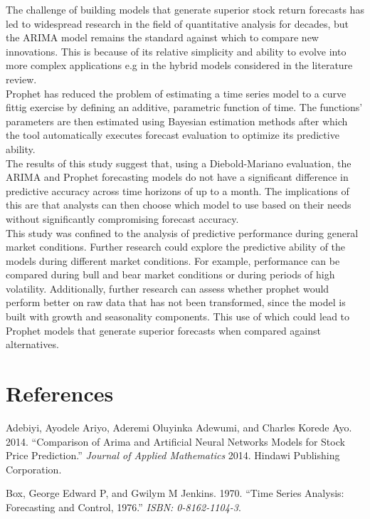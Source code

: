 \documentclass[12pt,a4paper]{article}
\numberwithin{equation}{section}
\numberwithin{figure}{section}
\numberwithin{table}{section}
\begin{document}
The challenge of building models that generate superior stock return
forecasts has led to widespread research in the field of quantitative
analysis for decades, but the ARIMA model remains the standard against
which to compare new innovations. This is because of its relative
simplicity and ability to evolve into more complex applications e.g in
the hybrid models considered in the literature review.\\
Prophet has reduced the problem of estimating a time series model to a
curve fittig exercise by defining an additive, parametric function of
time. The functions' parameters are then estimated using Bayesian
estimation methods after which the tool automatically executes forecast
evaluation to optimize its predictive ability.\\
The results of this study suggest that, using a Diebold-Mariano
evaluation, the ARIMA and Prophet forecasting models do not have a
significant difference in predictive accuracy across time horizons of up
to a month. The implications of this are that analysts can then choose
which model to use based on their needs without significantly
compromising forecast accuracy.\\
This study was confined to the analysis of predictive performance during
general market conditions. Further research could explore the predictive
ability of the models during different market conditions. For example,
performance can be compared during bull and bear market conditions or
during periods of high volatility. Additionally, further research can
assess whether prophet would perform better on raw data that has not
been transformed, since the model is built with growth and seasonality
components. This use of which could lead to Prophet models that generate
superior forecasts when compared against alternatives.

\section*{References}\label{references}

\hypertarget{refs}{}
\hypertarget{ref-adebiyi2014comparison}{}
Adebiyi, Ayodele Ariyo, Aderemi Oluyinka Adewumi, and Charles Korede
Ayo. 2014. ``Comparison of Arima and Artificial Neural Networks Models
for Stock Price Prediction.'' \emph{Journal of Applied Mathematics}
2014. Hindawi Publishing Corporation.

\hypertarget{ref-box1970time}{}
Box, George Edward P, and Gwilym M Jenkins. 1970. ``Time Series
Analysis: Forecasting and Control, 1976.'' \emph{ISBN: 0-8162-1104-3}.
\end{document}
